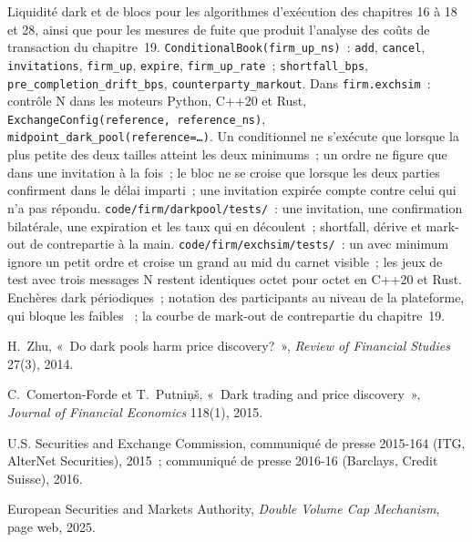 \begin{build}
 Liquidité dark et de blocs pour les algorithmes d'exécution des chapitres 16 à 18 et 28, ainsi que pour les mesures de fuite que produit
l'analyse des coûts de transaction du chapitre~19.
 \texttt{ConditionalBook(firm\_up\_ns)}~: \texttt{add}, \texttt{cancel}, \texttt{invitations}, \texttt{firm\_up}, \texttt{expire},
\texttt{firm\_up\_rate}~; \texttt{shortfall\_bps}, \texttt{pre\_completion\_drift\_bps}, \texttt{counterparty\_markout}. Dans \texttt{firm.exchsim}~: contrôle
N dans les moteurs Python, C++20 et Rust, \texttt{ExchangeConfig(reference, reference\_ns)}, \texttt{midpoint\_dark\_pool(reference=\dots)}.
 Un conditionnel ne s'exécute que lorsque la plus petite des deux tailles atteint les deux minimums~; un ordre ne figure que dans une invitation à la fois~; le bloc ne se croise que
lorsque les deux parties confirment dans le délai imparti~; une invitation expirée compte contre celui qui n'a pas répondu.
 \texttt{code/firm/darkpool/tests/}~: une invitation, une confirmation bilatérale, une expiration et les taux qui en découlent~; shortfall, dérive et
mark-out de contrepartie à la main. \texttt{code/firm/exchsim/tests/}~: un  avec minimum ignore un petit ordre et croise un grand au
mid du carnet visible~; les jeux de test avec trois messages N restent identiques octet pour octet en C++20 et Rust.
 Enchères dark périodiques~; notation des participants au niveau de la plateforme, qui bloque les faibles ~; la courbe de mark-out de contrepartie du chapitre~19.
\end{build}

\begin{omsources}
\item H.~Zhu, «~Do dark pools harm price discovery?~», \emph{Review of Financial Studies} 27(3), 2014.
\item C.~Comerton-Forde et T.~Putni\c{n}\v{s}, «~Dark trading and price discovery~», \emph{Journal of Financial Economics} 118(1), 2015.
\item U.S. Securities and Exchange Commission, communiqué de presse 2015-164 (ITG, AlterNet Securities), 2015~; communiqué de presse 2016-16 (Barclays, Credit Suisse),
2016.
\item European Securities and Markets Authority, \emph{Double Volume Cap Mechanism}, page web, 2025.
\end{omsources}

